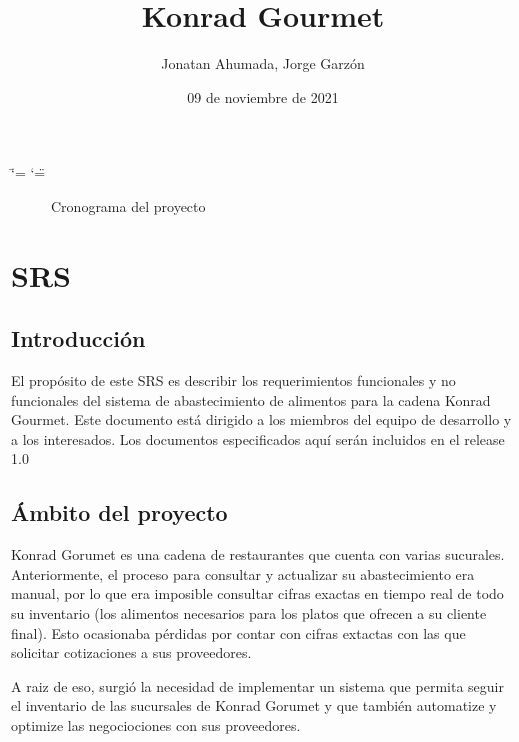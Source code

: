 \documentclass[letterpaper,10pt,spanish]{sphinxmanual}
\title{Konrad Gourmet}
\date{09 de noviembre de 2021}
\author{Jonatan Ahumada, Jorge Garzón}
\let\sphinxpxdimen\pdfpxdimen\else\newdimen\sphinxpxdimen
\begin{document}
\ifdefined\shorthandoff
  \ifnum\catcode`\=\string=\active\shorthandoff{=}\fi
  \ifnum\catcode`\"=\active{}\fi
\fi

\pagestyle{empty}
\sphinxmaketitle
\pagestyle{plain}
\sphinxtableofcontents
\pagestyle{normal}
\label{\detokenize{index::doc}}


\begin{figure}[htbp]
\centering
\capstart

\noindent\sphinxincludegraphics[width=600\sphinxpxdimen]{{cronograma}.png}
\caption{Cronograma del proyecto}\label{\detokenize{index:id1}}
\begin{sphinxlegend}\begin{quote}
\end{quote}
\end{sphinxlegend}
\end{figure}


\chapter{SRS}
\label{\detokenize{SRS:srs}}\label{\detokenize{SRS::doc}}

\section{Introducción}
\label{\detokenize{SRS:introduccion}}
\sphinxAtStartPar
El propósito de este SRS es
describir los requerimientos
funcionales y no funcionales
del sistema de abastecimiento
de alimentos para la cadena
Konrad Gourmet. Este documento
está dirigido a los miembros
del equipo de desarrollo
y a los interesados. Los
documentos especificados
aquí serán incluidos en el release
1.0


\section{Ámbito del proyecto}
\label{\detokenize{SRS:ambito-del-proyecto}}
\sphinxAtStartPar
Konrad Gorumet es una cadena de
restaurantes que cuenta con varias sucurales.
Anteriormente, el proceso para consultar y
actualizar su abastecimiento era manual,
por lo que era imposible consultar
cifras exactas en tiempo real de todo
su inventario (los alimentos necesarios para
los platos que ofrecen a su cliente final). Esto ocasionaba pérdidas
por contar con cifras extactas con las
que solicitar cotizaciones a sus proveedores.

\sphinxAtStartPar
A raiz de eso, surgió la necesidad de implementar
un sistema que permita seguir el inventario
de las sucursales de Konrad Gorumet y que también automatize
y optimize las negociociones con sus proveedores.
\end{document}

